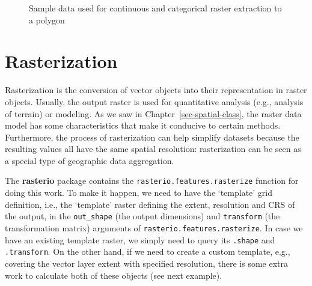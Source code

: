 \documentclass[
  letterpaper,
]{krantz}
\begin{document}
\begin{figure}

\begin{minipage}{0.50\linewidth}



\end{minipage}%
%
\begin{minipage}{0.50\linewidth}



\end{minipage}%

\caption{\label{fig-raster-extract-to-polygon}Sample data used for
continuous and categorical raster extraction to a polygon}

\end{figure}%

\section{Rasterization}\label{sec-rasterization}

Rasterization is the conversion of vector objects into their
representation in raster objects. Usually, the output raster is used for
quantitative analysis (e.g., analysis of terrain) or modeling. As we saw
in Chapter~\ref{sec-spatial-class}, the raster data model has some
characteristics that make it conducive to certain methods. Furthermore,
the process of rasterization can help simplify datasets because the
resulting values all have the same spatial resolution: rasterization can
be seen as a special type of geographic data aggregation.

The \textbf{rasterio} package contains the
\texttt{rasterio.features.rasterize} function for doing this work. To
make it happen, we need to have the `template' grid definition, i.e.,
the `template' raster defining the extent, resolution and CRS of the
output, in the \texttt{out\_shape} (the output dimensions) and
\texttt{transform} (the transformation matrix) arguments of
\texttt{rasterio.features.rasterize}. In case we have an existing
template raster, we simply need to query its \texttt{.shape} and
\texttt{.transform}. On the other hand, if we need to create a custom
template, e.g., covering the vector layer extent with specified
resolution, there is some extra work to calculate both of these objects
(see next example).
\end{document}
